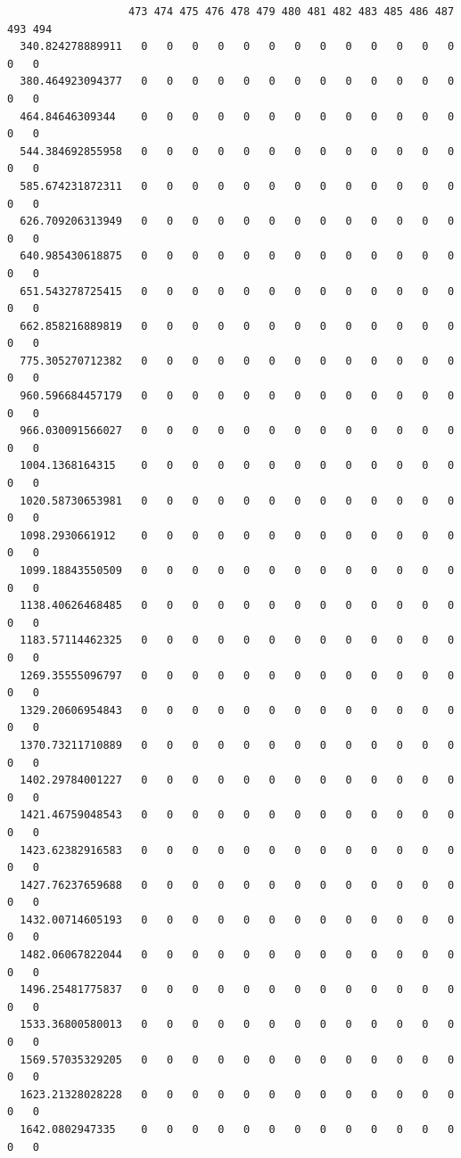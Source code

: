 \documentclass[
  letterpaper,
  DIV=11,
  numbers=noendperiod]{scrartcl}
\begin{document}
\begin{verbatim}
                   473 474 475 476 478 479 480 481 482 483 485 486 487 493 494
  340.824278889911   0   0   0   0   0   0   0   0   0   0   0   0   0   0   0
  380.464923094377   0   0   0   0   0   0   0   0   0   0   0   0   0   0   0
  464.84646309344    0   0   0   0   0   0   0   0   0   0   0   0   0   0   0
  544.384692855958   0   0   0   0   0   0   0   0   0   0   0   0   0   0   0
  585.674231872311   0   0   0   0   0   0   0   0   0   0   0   0   0   0   0
  626.709206313949   0   0   0   0   0   0   0   0   0   0   0   0   0   0   0
  640.985430618875   0   0   0   0   0   0   0   0   0   0   0   0   0   0   0
  651.543278725415   0   0   0   0   0   0   0   0   0   0   0   0   0   0   0
  662.858216889819   0   0   0   0   0   0   0   0   0   0   0   0   0   0   0
  775.305270712382   0   0   0   0   0   0   0   0   0   0   0   0   0   0   0
  960.596684457179   0   0   0   0   0   0   0   0   0   0   0   0   0   0   0
  966.030091566027   0   0   0   0   0   0   0   0   0   0   0   0   0   0   0
  1004.1368164315    0   0   0   0   0   0   0   0   0   0   0   0   0   0   0
  1020.58730653981   0   0   0   0   0   0   0   0   0   0   0   0   0   0   0
  1098.2930661912    0   0   0   0   0   0   0   0   0   0   0   0   0   0   0
  1099.18843550509   0   0   0   0   0   0   0   0   0   0   0   0   0   0   0
  1138.40626468485   0   0   0   0   0   0   0   0   0   0   0   0   0   0   0
  1183.57114462325   0   0   0   0   0   0   0   0   0   0   0   0   0   0   0
  1269.35555096797   0   0   0   0   0   0   0   0   0   0   0   0   0   0   0
  1329.20606954843   0   0   0   0   0   0   0   0   0   0   0   0   0   0   0
  1370.73211710889   0   0   0   0   0   0   0   0   0   0   0   0   0   0   0
  1402.29784001227   0   0   0   0   0   0   0   0   0   0   0   0   0   0   0
  1421.46759048543   0   0   0   0   0   0   0   0   0   0   0   0   0   0   0
  1423.62382916583   0   0   0   0   0   0   0   0   0   0   0   0   0   0   0
  1427.76237659688   0   0   0   0   0   0   0   0   0   0   0   0   0   0   0
  1432.00714605193   0   0   0   0   0   0   0   0   0   0   0   0   0   0   0
  1482.06067822044   0   0   0   0   0   0   0   0   0   0   0   0   0   0   0
  1496.25481775837   0   0   0   0   0   0   0   0   0   0   0   0   0   0   0
  1533.36800580013   0   0   0   0   0   0   0   0   0   0   0   0   0   0   0
  1569.57035329205   0   0   0   0   0   0   0   0   0   0   0   0   0   0   0
  1623.21328028228   0   0   0   0   0   0   0   0   0   0   0   0   0   0   0
  1642.0802947335    0   0   0   0   0   0   0   0   0   0   0   0   0   0   0

\end{verbatim}
\end{document}
